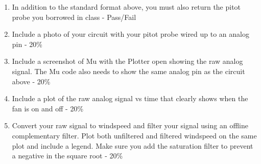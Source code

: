 

\begin{enumerate}[itemsep=-5pt]
\item In addition to the standard format above, you must also return the pitot probe you borrowed in class - Pass/Fail
\item Include a photo of your circuit with your pitot probe wired up to an analog pin - 20\%
\item Include a screenshot of Mu with the Plotter open showing the raw analog signal. The Mu code also needs to show the same analog pin as the circuit above - 20\%
\item Include a plot of the raw analog signal vs time that clearly shows when the fan is on and off - 20\%
\item Convert your raw signal to windspeed and filter your signal using an offline complementary filter. Plot both unfiltered and filtered windspeed on the same plot and include a legend. Make sure you add the saturation filter to prevent a negative in the square root - 20\%
\end{enumerate}
